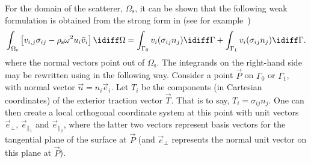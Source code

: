 For the domain of the scatterer, $\Omega_{\mathrm{s}}$, it can be shown that the following weak formulation is obtained from the strong form in  (see for example~\cite{Ihlenburg1998fea})
\begin{equation}\label{Eq2:intermediateStepFSI}
	\int_{\Omega_{\mathrm{s}}} \left[v_{i,j}\sigma_{ij} - \rho_{\mathrm{s}}\omega^2 u_i\bar{v}_i\right]\idiff\Omega = \int_{\Gamma_0} v_i(\sigma_{ij} n_j)\idiff\Gamma + \int_{\Gamma_1} v_i(\sigma_{ij} n_j)\idiff\Gamma.
\end{equation}
where the normal vectors point out of $\Omega_{\mathrm{s}}$. The integrands on the right-hand side may be rewritten using  in the following way. Consider a point $\vec{P}$ on $\Gamma_0$ or $\Gamma_1$, with normal vector $\vec{n}=n_i\vec{e}_i$. Let $T_i$ be the components (in Cartesian coordinates) of the exterior traction vector $\vec{T}$. That is to say, $T_i = \sigma_{ij} n_j$. One can then create a local orthogonal coordinate system at this point with unit vectors $\vec{e}_\perp$, $\vec{e}_{\|_1}$ and $\vec{e}_{\|_2}$, where the latter two vectors represent basis vectors for the tangential plane of the surface at $\vec{P}$ (and $\vec{e}_\perp$ represents the normal unit vector on this plane at $\vec{P}$). 

